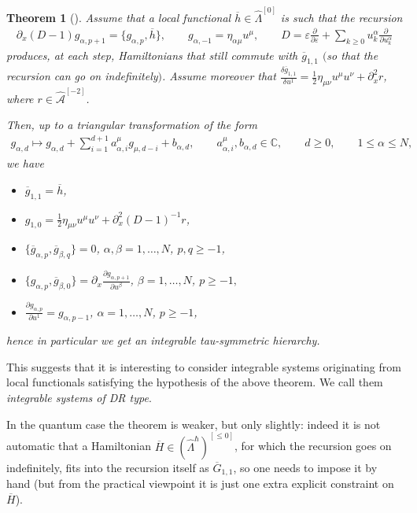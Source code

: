 \documentclass[pdftex]{sigma}
\numberwithin{equation}{section}
\newtheorem{Theorem}{Theorem}[section]
\newcommand{\mbC}{\mathbb C}
\newcommand{\og}{\overline g}
\newcommand{\oh}{\overline h}
\newcommand{\hLambda}{\widehat\Lambda}
\def\d{{\partial}}
\newcommand{\<}{\left<}
\renewcommand{\>}{\right>}
\newcommand{\eps}{\varepsilon}
\newcommand{\hcA}{\widehat{\mathcal A}}
\newcommand{\oG}{{\overline G}}
\newcommand{\oH}{{\overline H}}
\begin{document}
\begin{Theorem}[\cite{BDGR16b}]\label{theorem:recursion->integrability classical}
Assume that a local functional $\oh \in \hLambda^{[0]}$ is such that the recursion
\begin{gather*} \partial_x (D-1) g_{\alpha,p+1} = \big\{ g_{\alpha,p} , \oh \big\},\qquad
 g_{\alpha,-1}=\eta_{\alpha \mu} u^\mu ,\qquad D=\eps \frac{\d}{\d \eps} + \sum_{k\geq 0} u^\alpha_k \frac{\d}{\d u^\alpha_k}\end{gather*}
produces, at each step, Hamiltonians that still commute with $\og_{1,1}$ $($so that the recursion can go on indefinitely$)$. Assume moreover that $\frac{\delta \og_{1,1}}{\delta u^1} = \frac{1}{2}\eta_{\mu \nu } u^\mu u^\nu + \d_x^2 r$, where $r\in \hcA^{[-2]}$.

Then, up to a triangular transformation of the form
\begin{gather*}g_{\alpha,d} \mapsto g_{\alpha,d} + \sum_{i=1}^{d+1} a^\mu_{\alpha, i} g_{\mu,d-i} + b_{\alpha,d}, \qquad a^\mu_{\alpha, i}, b_{\alpha,d} \in \mbC, \qquad d\geq0, \qquad 1\leq \alpha\leq N,\end{gather*}
we have
\begin{itemize}\itemsep=0pt
\item[$(i)$] $\og_{1,1} = \oh$,
\item[$(ii)$] $g_{1,0} = \frac{1}{2}\eta_{\mu \nu } u^\mu u^\nu + \d_x^2 (D-1)^{-1} r$,
\item[$(iii)$] $\{\og_{\alpha,p},\og_{\beta,q}\} = 0$, $\alpha,\beta=1,\dots,N$, $p,q\geq -1$,
\item[$(iv)$] $\{g_{\alpha,p},\og_{\beta,0}\} = \d_x \frac{\d g_{\alpha,p+1}}{\d u^\beta}$, $\beta=1,\dots,N$, $p\geq -1,$
\item[$(v)$] $\frac{\d g_{\alpha,p}}{\d u^1} = g_{\alpha,p-1}$, $\alpha=1,\dots,N$, $p\geq -1$,
\end{itemize}
hence in particular we get an integrable tau-symmetric hierarchy.
\end{Theorem}

This suggests that it is interesting to consider integrable systems originating from local functionals satisfying the hypothesis of the above theorem. We call them \emph{integrable systems of DR type}.

In the quantum case the theorem is weaker, but only slightly: indeed it is not automatic that a Hamiltonian $\oH \in (\hLambda^\hbar)^{[\leq 0]}$, for which the recursion goes on indef\/initely, f\/its into the recursion itself as $\oG_{1,1}$, so one needs to impose it by hand (but from the practical viewpoint it is just one extra explicit constraint on $\oH$).
\end{document}
